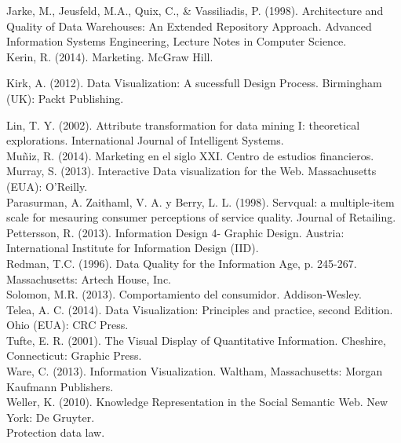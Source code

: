 Jarke, M., Jeusfeld, M.A., Quix, C., & Vassiliadis, P. (1998). Architecture and Quality of
Data Warehouses: An Extended Repository Approach. Advanced Information Systems
Engineering, Lecture Notes in Computer Science.\\

Kerin, R. (2014). Marketing. McGraw Hill. 

Kirk, A. (2012). Data Visualization: A sucessfull Design Process. Birmingham (UK):
Packt Publishing.

Lin, T. Y. (2002). Attribute transformation for data mining I: theoretical explorations.
International Journal of Intelligent Systems.\\

Muñiz, R. (2014). Marketing en el siglo XXI. Centro de estudios financieros. \\

Murray, S. (2013). Interactive Data visualization for the Web. Massachusetts (EUA):
O’Reilly.\\

Parasurman, A. Zaithaml, V. A. y Berry, L. L. (1998). Servqual: a multiple-item scale for
mesauring consumer perceptions of service quality. Journal of Retailing.\\ 

Pettersson, R. (2013). Information Design 4- Graphic Design. Austria: International
Institute for Information Design (IID).\\

Redman, T.C. (1996). Data Quality for the Information Age, p. 245-267. Massachusetts:
Artech House, Inc.\\

Solomon, M.R. (2013). Comportamiento del consumidor. Addison-Wesley.\\

Telea, A. C. (2014). Data Visualization: Principles and practice, second Edition. Ohio
(EUA): CRC Press. \\

Tufte, E. R. (2001). The Visual Display of Quantitative Information. Cheshire,
Connecticut: Graphic Press.\\

 Ware, C. (2013). Information Visualization. Waltham, Massachusetts: Morgan
Kaufmann Publishers. \\

Weller, K. (2010). Knowledge Representation in the Social Semantic Web. New York:
De Gruyter. \\





Protection data law.

